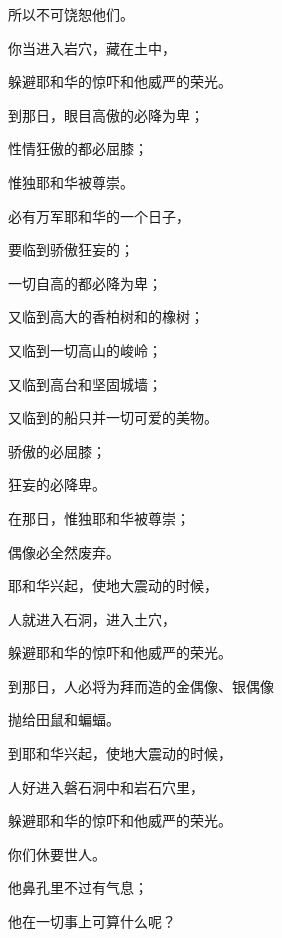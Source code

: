 {\par }{\Q 所以不可饶恕他们。
\par }{\Q {}你当进入岩穴，藏在土中，
\par }{\Q 躲避耶和华的惊吓和他威严的荣光。
\par }{\Q {}到那日，眼目高傲的必降为卑；
\par }{\Q 性情狂傲的都必屈膝；
\par }{\Q 惟独耶和华被尊崇。
\par }{\BB \par }{\Q {}必有万军耶和华{}的一个日子，
\par }{\Q 要临到骄傲狂妄的；
\par }{\Q 一切自高的都必降为卑；
\par }{\Q {}又临到{}高大的香柏树和{}的橡树；
\par }{\Q {}又临到一切高山的峻岭；
\par }{\Q {}又临到高台和坚固城墙；
\par }{\Q {}又临到{}的船只并一切可爱的美物。
\par }{\Q {}骄傲的必屈膝；
\par }{\Q 狂妄的必降卑。
\par }{\Q 在那日，惟独耶和华被尊崇；
\par }{\Q {}偶像必全然废弃。
\par }{\Q {}耶和华兴起，使地大震动的时候，
\par }{\Q 人就进入石洞，进入土穴，
\par }{\Q 躲避耶和华的惊吓和他威严的荣光。
\par }{\Q {}到那日，人必将为拜而造的金偶像、银偶像
\par }{\Q 抛给田鼠和蝙蝠。
\par }{\Q {}到耶和华兴起，使地大震动的时候，
\par }{\Q 人好进入磐石洞中和岩石穴里，
\par }{\Q 躲避耶和华的惊吓和他威严的荣光。
\par }{\Q {}你们休要{}世人。
\par }{\Q 他鼻孔里不过有气息；
\par }{\Q 他在一切事上可算什么呢？

}
